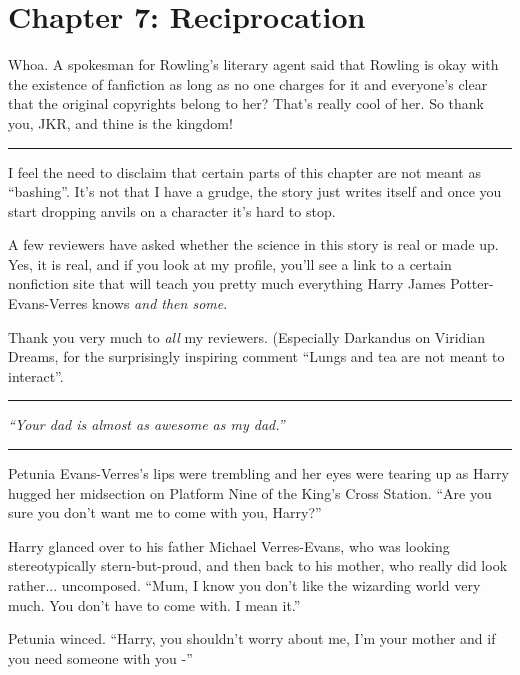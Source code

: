 \chapter{Chapter 7: Reciprocation}
Whoa. A spokesman for Rowling's literary agent said that Rowling is okay
with the existence of fanfiction as long as no one charges for it and
everyone's clear that the original copyrights belong to her? That's
really cool of her. So thank you, JKR, and thine is the kingdom!

\begin{center}\rule{3in}{0.4pt}\end{center}

I feel the need to disclaim that certain parts of this chapter are not
meant as ``bashing''. It's not that I have a grudge, the story just
writes itself and once you start dropping anvils on a character it's
hard to stop.

A few reviewers have asked whether the science in this story is real or
made up. Yes, it is real, and if you look at my profile, you'll see a
link to a certain nonfiction site that will teach you pretty much
everything Harry James Potter-Evans-Verres knows \emph{and then some}.

Thank you very much to \emph{all} my reviewers. (Especially Darkandus on
Viridian Dreams, for the surprisingly inspiring comment ``Lungs and tea
are not meant to interact''.

\begin{center}\rule{3in}{0.4pt}\end{center}

\emph{``Your dad is almost as awesome as my dad.''}

\begin{center}\rule{3in}{0.4pt}\end{center}

Petunia Evans-Verres's lips were trembling and her eyes were tearing up
as Harry hugged her midsection on Platform Nine of the King's Cross
Station. ``Are you sure you don't want me to come with you, Harry?''

Harry glanced over to his father Michael Verres-Evans, who was looking
stereotypically stern-but-proud, and then back to his mother, who really
did look rather... uncomposed. ``Mum, I know you don't like the
wizarding world very much. You don't have to come with. I mean it.''

Petunia winced. ``Harry, you shouldn't worry about me, I'm your mother
and if you need someone with you -''

